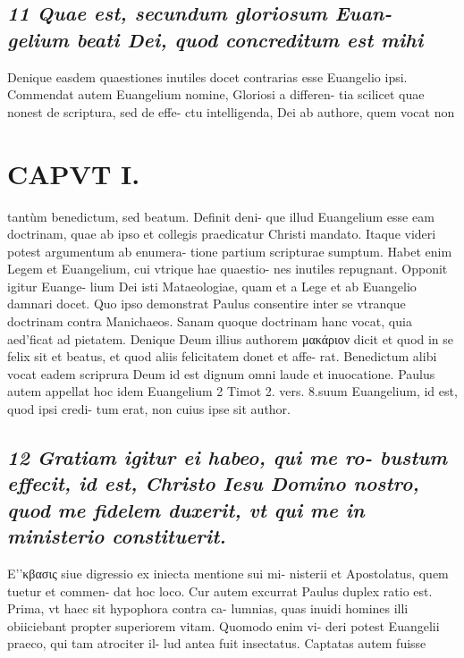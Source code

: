 \documentclass{article}
\begin{document}
\begin{pages}
\subsection*{\textit{11 Quae est, secundum gloriosum Euan- gelium beati Dei, quod concreditum est mihi }}\pstart Denique easdem quaestiones inutiles docet contrarias esse Euangelio ipsi. Commendat autem Euangelium nomine, Gloriosi a differen- tia scilicet quae nonest de scriptura, sed de effe- ctu intelligenda, Dei ab authore, quem vocat non  \pend
\section*{CAPVT I. }
\marginpar{[ p.23 ]}\pstart tantùm benedictum, sed beatum. Definit deni- que illud Euangelium esse eam doctrinam, quae ab ipso et collegis praedicatur Christi mandato. Itaque videri potest argumentum ab enumera- tione partium scripturae sumptum. Habet enim Legem et Euangelium, cui vtrique hae quaestio- nes inutiles repugnant. Opponit igitur Euange- lium Dei isti Mataeologiae, quam et a Lege et ab Euangelio damnari docet. Quo ipso demonstrat Paulus consentire inter se vtranque doctrinam contra Manichaeos. Sanam quoque doctrinam hanc vocat, quia aed’ficat ad pietatem. Denique Deum illius authorem μακάριον dicit et quod in se felix sit et beatus, et quod aliis felicitatem donet et affe- rat. Benedictum alibi vocat eadem scriprura Deum id est dignum omni laude et inuocatione. Paulus autem appellat hoc idem Euangelium 2 Timot 2. vers. 8.suum Euangelium, id est, quod ipsi credi- tum erat, non cuius ipse sit author.  \pend
{}
{}
\subsection*{\textit{12 Gratiam igitur ei habeo, qui me ro- bustum effecit, id est, Christo Iesu Domino nostro, quod me fidelem duxerit, vt qui me in ministerio constituerit. }}\pstart E’'κβασις siue digressio ex iniecta mentione sui mi- nisterii et Apostolatus, quem tuetur et commen- dat hoc loco. Cur autem excurrat Paulus duplex ratio est. Prima, vt haec sit hypophora contra ca- lumnias, quas inuidi homines illi obiiciebant propter superiorem vitam. Quomodo enim vi- deri potest Euangelii praeco, qui tam atrociter il- lud antea fuit insectatus. Captatas autem fuisse  \pend

\end{pages}
\end{document}
